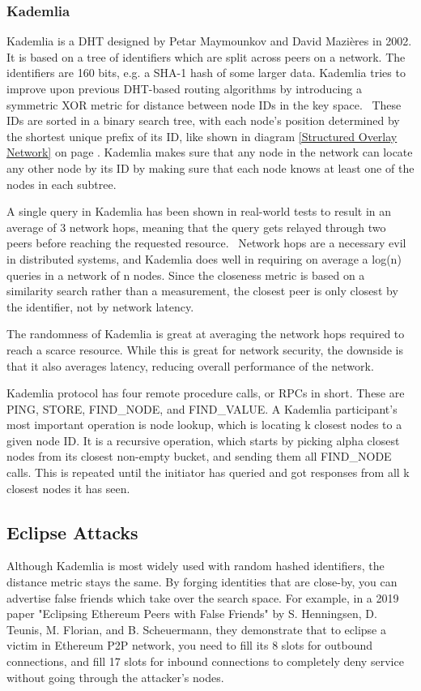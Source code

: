 \subsubsection{Kademlia}
Kademlia is a DHT designed by Petar Maymounkov and David Mazières in 2002. It is based on a tree of identifiers which are split across peers on a network. The identifiers are 160 bits, e.g. a SHA-1 hash of some larger data. Kademlia tries to improve upon previous DHT-based routing algorithms by introducing a symmetric XOR metric for distance between node IDs in the key space.~\cite{Petar_Maymounkov2020-sx} These IDs are sorted in a binary search tree, with each node's position determined by the shortest unique prefix of its ID, like shown in diagram \ref{Structured Overlay Network} on page \pageref{Structured Overlay Network}. Kademlia makes sure that any node in the network can locate any other node by its ID by making sure that each node knows at least one of the nodes in each subtree.

A single query in Kademlia has been shown in real-world tests to result in an average of 3 network hops, meaning that the query gets relayed through two peers before reaching the requested resource.~\cite{Roos2013-mb} Network hops are a necessary evil in distributed systems, and Kademlia does well in requiring on average a log(n) queries in a network of n nodes. Since the closeness metric is based on a similarity search rather than a measurement, the closest peer is only closest by the identifier, not by network latency.~\cite{Eigenmann2020-zm}

The randomness of Kademlia is great at averaging the network hops required to reach a scarce resource. While this is great for network security, the downside is that it also averages latency, reducing overall performance of the network.

Kademlia protocol has four remote procedure calls, or RPCs in short. These are PING, STORE, FIND\_NODE, and FIND\_VALUE. A Kademlia participant's most important operation is node lookup, which is locating k closest nodes to a given node ID. It is a recursive operation, which starts by picking alpha closest nodes from its closest non-empty bucket, and sending them all FIND\_NODE calls. This is repeated until the initiator has queried and got responses from all k closest nodes it has seen.

\subsection{Eclipse Attacks}
Although Kademlia is most widely used with random hashed identifiers, the distance metric stays the same. By forging identities that are close-by, you can advertise false friends which take over the search space. For example, in a 2019 paper "Eclipsing Ethereum Peers with False Friends" by S. Henningsen, D. Teunis, M. Florian, and B. Scheuermann, they demonstrate that to eclipse a victim in Ethereum P2P network, you need to fill its 8 slots for outbound connections, and fill 17 slots for inbound connections to completely deny service without going through the attacker's nodes.~\cite{Henningsen2019-mf}

